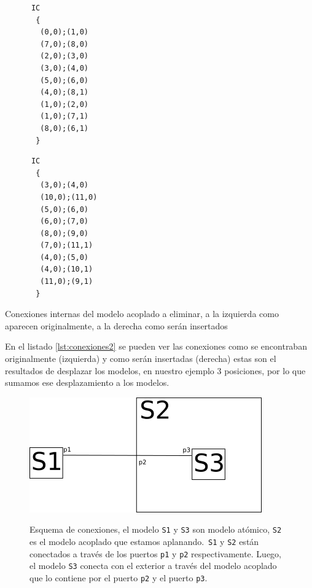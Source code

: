 \begin{itemize}
\begin{listing}
\begin{minipage}[t]{0.5\textwidth}
\begin{verbatim}
      IC
       {
        (0,0);(1,0)
        (7,0);(8,0)
        (2,0);(3,0)
        (3,0);(4,0)
        (5,0);(6,0)
        (4,0);(8,1)
        (1,0);(2,0)
        (1,0);(7,1)
        (8,0);(6,1)
       }
\end{verbatim}
        \end{minipage}
        \begin{minipage}[t]{0.5\textwidth}
\begin{verbatim}
      IC
       {
        (3,0);(4,0)
        (10,0);(11,0)
        (5,0);(6,0)
        (6,0);(7,0)
        (8,0);(9,0)
        (7,0);(11,1)
        (4,0);(5,0)
        (4,0);(10,1)
        (11,0);(9,1)
       }
\end{verbatim}
        \end{minipage}
        \label{lst:conexiones2}
        \caption{Conexiones internas del modelo acoplado a eliminar, a la izquierda como aparecen originalmente, a la derecha como serán insertados}
\end{listing}

        En el listado \ref{lst:conexiones2} se pueden ver las conexiones como se encontraban originalmente (izquierda) y como serán insertadas (derecha)
        estas son el resultados de desplazar los modelos, en nuestro ejemplo $3$ posiciones, por lo que sumamos ese desplazamiento a los modelos.

\begin{figure}[!htbp]
\centering
\includegraphics[width=.75\textwidth]{text3418}
\label{fig:aplanado-ports}
\caption{Esquema de conexiones, el modelo \texttt{S1} y \texttt{S3} son modelo atómico, \texttt{S2} es el modelo acoplado que estamos aplanando.\
	\texttt{S1} y \texttt{S2} están conectados a través de los puertos \texttt{p1} y \texttt{p2} respectivamente. Luego, el modelo \texttt{S3} conecta con
	el exterior a través del modelo acoplado que lo contiene por el puerto \texttt{p2} y el puerto  \texttt{p3}.
	}
\end{figure}


\end{itemize}
